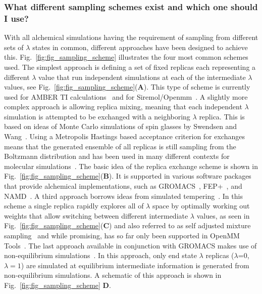 \documentclass[9pt,bestpractices]{livecoms}
\begin{document}
\subsubsection{What different sampling schemes exist and which one should I use?}
\label{sec:sampling_schemes}
With all alchemical simulations having the requirement of sampling from different sets of $\lambda$ states in common, different approaches have been designed to achieve this. Fig.~\ref{fig:fig_sampling_scheme} illustrates the four most common schemes used. The simplest approach is defining a set of fixed replicas each representing a different $\lambda$ value that run independent simulations at each of the intermediate $\lambda$ values, see Fig.~\ref{fig:fig_sampling_scheme}(\textbf{A}). This type of scheme is currently used for AMBER TI calculations~\cite{song2019} and for Siremol/Openmm~\cite{}. A slightly more complex approach is allowing replica mixing, meaning that each independent $\lambda$ simulation is attempted to be exchanged with a neighboring $\lambda$ replica. This is based on ideas of Monte Carlo simulations of spin glasses by Swendsen and Wang~\cite{swendsen1986replica}. Using a Metropolis Hastings based acceptance criterion for exchanges means that the generated ensemble of all replicas is still sampling from the Boltzmann distribution and has been used in many different contexts for molecular simulations~\cite{sugita2000multidimensionala,sugita1999replicaexchangea, woods2003developmenta, jiang2010free}. The basic idea of the replica exchange scheme is shown in Fig.~\ref{fig:fig_sampling_scheme}(\textbf{B}). It is supported in various software packages that provide alchemical implementations, such as GROMACS~\cite{aldeghi2015accurate}, FEP+~\cite{wang2015accurate}, and NAMD~\cite{jiang2019computing}. A third approach borrows ideas from simulated tempering~\cite{marinari1992simulateda}. In this scheme a single replica rapidly explores all of $\lambda$ space by optimally working out weights that allow switching between different intermediate $\lambda$ values, as seen in Fig.~\ref{fig:fig_sampling_scheme}(\textbf{C}) and also referred to as self adjusted mixture sampling~\cite{lyubartsev1992newa, li2007simulated, tan2017optimally} and while promising, has so far only been supported in OpenMM Tools~\cite{andrearizzi2019choderalab}. The last approach available in conjunction with GROMACS makes use of non-equilibrium simulations~\cite{aldeghi2018accurate}. In this approach, only end state $\lambda$ replicas ($\lambda$=0, $\lambda=1$) are simulated at equilibrium intermediate information is generated from non-equilibrium simulations. A schematic of this approach is shown in Fig.~\ref{fig:fig_sampling_scheme} \textbf{D}. 
\end{document}

